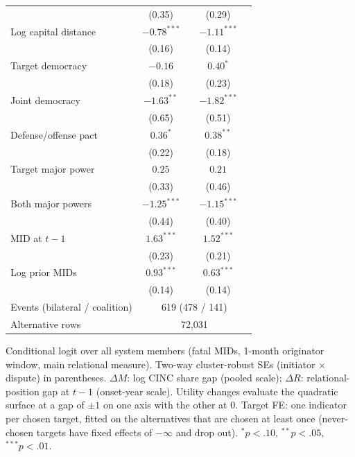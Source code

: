 \documentclass[11pt]{article}
\begin{document}
\begin{table}[!htbp]
\begin{tabular}{lcccc}
 & (0.35) &  & (0.29) &  \\
Log capital distance & $-0.78^{***}$ &  & $-1.11^{***}$ &  \\
 & (0.16) &  & (0.14) &  \\
Target democracy & $-0.16$ &  & $0.40^{*}$ &  \\
 & (0.18) &  & (0.23) &  \\
Joint democracy & $-1.63^{**}$ &  & $-1.82^{***}$ &  \\
 & (0.65) &  & (0.51) &  \\
Defense/offense pact & $0.36^{*}$ &  & $0.38^{**}$ &  \\
 & (0.22) &  & (0.18) &  \\
Target major power & $0.25$ &  & $0.21$ &  \\
 & (0.33) &  & (0.46) &  \\
Both major powers & $-1.25^{***}$ &  & $-1.15^{***}$ &  \\
 & (0.44) &  & (0.40) &  \\
MID at $t-1$ & $1.63^{***}$ &  & $1.52^{***}$ &  \\
 & (0.23) &  & (0.21) &  \\
Log prior MIDs & $0.93^{***}$ &  & $0.63^{***}$ &  \\
 & (0.14) &  & (0.14) &  \\
\midrule
Events (bilateral / coalition) & \multicolumn{4}{c}{619 (478 / 141)} \\
Alternative rows & \multicolumn{4}{c}{72,031} \\
\bottomrule
\end{tabular}
\begin{minipage}{0.95\linewidth}\footnotesize\smallskip Conditional logit over all system members (fatal MIDs, 1-month originator window, main relational measure). Two-way cluster-robust SEs (initiator $\times$ dispute) in parentheses. $\Delta M$: log CINC share gap (pooled scale); $\Delta R$: relational-position gap at $t-1$ (onset-year scale). Utility changes evaluate the quadratic surface at a gap of $\pm 1$ on one axis with the other at 0. Target FE: one indicator per chosen target, fitted on the alternatives that are chosen at least once (never-chosen targets have fixed effects of $-\infty$ and drop out). $^{*}p<.10$, $^{**}p<.05$, $^{***}p<.01$.\end{minipage}
\end{table}
\end{document}
